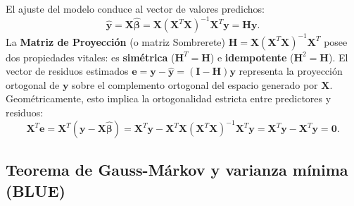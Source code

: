 \documentclass[11pt,a4paper]{article}
\begin{document}
\begin{alertabox}
El ajuste del modelo conduce al vector de valores predichos:
\begin{equation}
\hat{\mathbf{y}} = \mathbf{X}\hat{\boldsymbol{\beta}} = \mathbf{X}(\mathbf{X}^T \mathbf{X})^{-1} \mathbf{X}^T \mathbf{y} = \mathbf{H}\mathbf{y}.
\end{equation}
La \textbf{Matriz de Proyección} (o matriz Sombrerete) $\mathbf{H} = \mathbf{X}(\mathbf{X}^T \mathbf{X})^{-1} \mathbf{X}^T$ posee dos propiedades vitales: es \textbf{simétrica} ($\mathbf{H}^T = \mathbf{H}$) e \textbf{idempotente} ($\mathbf{H}^2 = \mathbf{H}$).
El vector de residuos estimados $\mathbf{e} = \mathbf{y} - \hat{\mathbf{y}} = (\mathbf{I} - \mathbf{H})\mathbf{y}$ representa la proyección ortogonal de $\mathbf{y}$ sobre el complemento ortogonal del espacio generado por $\mathbf{X}$.
Geométricamente, esto implica la ortogonalidad estricta entre predictores y residuos:
\begin{equation}
\mathbf{X}^T \mathbf{e} = \mathbf{X}^T (\mathbf{y} - \mathbf{X}\hat{\boldsymbol{\beta}}) = \mathbf{X}^T \mathbf{y} - \mathbf{X}^T \mathbf{X} (\mathbf{X}^T \mathbf{X})^{-1} \mathbf{X}^T \mathbf{y} = \mathbf{X}^T \mathbf{y} - \mathbf{X}^T \mathbf{y} = \mathbf{0}.
\end{equation}
\end{alertabox}

\subsection{Teorema de Gauss-Márkov y varianza mínima (BLUE)}
\end{document}
